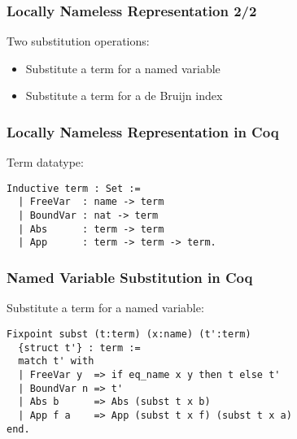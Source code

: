 \documentclass[notheorems]{beamer}
\begin{document}
\begin{frame}

  \frametitle{Locally Nameless Representation 2/2}

  Two substitution operations:
  \begin{itemize}
  \item Substitute a term for a named variable
  \item Substitute a term for a de Bruijn index\\[2em]
  \end{itemize}



\end{frame}


\begin{frame}[fragile]

  \frametitle{Locally Nameless Representation in Coq}

  Term datatype:
  \begin{lstlisting}
Inductive term : Set :=
  | FreeVar  : name -> term
  | BoundVar : nat -> term
  | Abs      : term -> term
  | App      : term -> term -> term.
  \end{lstlisting}

\end{frame}


\begin{frame}[fragile]

  \frametitle{Named Variable Substitution in Coq}

  Substitute a term for a named variable:
  \begin{lstlisting}
Fixpoint subst (t:term) (x:name) (t':term)
  {struct t'} : term :=
  match t' with
  | FreeVar y  => if eq_name x y then t else t'
  | BoundVar n => t'
  | Abs b      => Abs (subst t x b)
  | App f a    => App (subst t x f) (subst t x a)
end.
  \end{lstlisting}

\end{frame}
\end{document}
